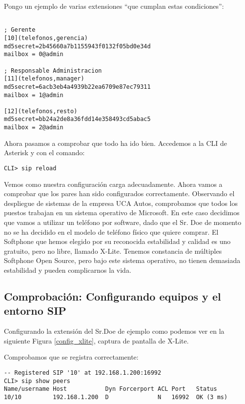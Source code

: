 Pongo un ejemplo de varias extensiones ``que cumplan estas condiciones'':

\begin{lstlisting}[style=bash,title={/etc/asterisk/sip.conf}]

; Gerente
[10](telefonos,gerencia)
md5secret=2b45660a7b1155943f0132f05bd0e34d
mailbox = 0@admin

; Responsable Administracion
[11](telefonos,manager)
md5secret=6acb3eb4a4939b22ea6709e87ec79311
mailbox = 1@admin

[12](telefonos,resto)
md5secret=bb24a2de8a36fdd14e358493cd5abac5
mailbox = 2@admin

\end{lstlisting}

Ahora pasamos a comprobar que todo ha ido bien. Accedemos a la CLI de Asterisk y con el comando:

\begin{lstlisting}[style=consola]
CLI> sip reload
\end{lstlisting}

Vemos como nuestra configuración carga adecuadamente. Ahora vamos a comprobar que los pares han sido configurados correctamente. Observando el despliegue de sistemas de la empresa UCA Autos, comprobamos que todos los puestos trabajan en un sistema operativo de Microsoft. En este caso decidimos que vamos a utilizar un teléfono por software, dado que el Sr. Doe de momento no se ha decidido en el modelo de teléfono físico que quiere comprar. El Softphone que hemos elegido por su reconocida estabilidad y calidad es uno gratuito, pero no libre, llamado X-Lite. Tenemos constancia de múltiples Softphone Open Source, pero bajo este sistema operativo, no tienen demasiada estabilidad y pueden complicarnos la vida.

\subsection{Comprobación: Configurando equipos y el entorno SIP}

Configurando la extensión del Sr.Doe de ejemplo como podemos ver en la siguiente Figura \ref{config_xlite}, captura de pantalla de X-Lite.


Comprobamos que se registra correctamente:

\begin{lstlisting}[style=consola]
-- Registered SIP '10' at 192.168.1.200:16992
CLI> sip show peers
Name/username Host           Dyn Forcerport ACL Port   Status
10/10         192.168.1.200  D              N   16992  OK (3 ms)
\end{lstlisting}

